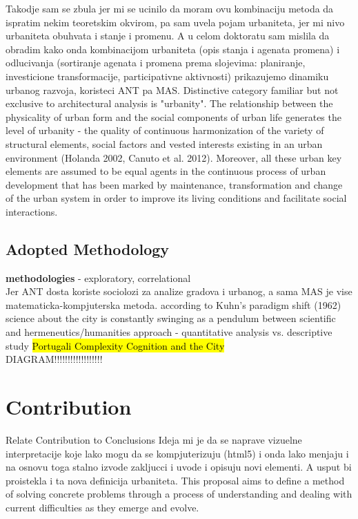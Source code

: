 \documentclass[11pt]{report}
\begin{document}
Takodje sam se zbula jer mi se ucinilo da moram ovu kombinaciju metoda da ispratim nekim teoretskim okvirom, pa sam uvela pojam urbaniteta, jer mi nivo urbaniteta obuhvata i stanje i promenu. A u celom doktoratu sam mislila da obradim kako onda kombinacijom urbaniteta (opis stanja i agenata promena) i odlucivanja (sortiranje agenata i promena prema slojevima: planiranje, investicione transformacije, participativne aktivnosti) prikazujemo dinamiku urbanog razvoja, koristeci  ANT pa MAS. 
Distinctive category familiar but not exclusive to architectural analysis is "urbanity". The relationship between the physicality of urban form and the social components of urban life generates the level of urbanity - the quality of continuous harmonization of the variety of structural elements, social factors and vested interests existing in an urban environment (Holanda 2002, Canuto et al. 2012). Moreover, all these urban key elements are assumed to be equal agents in the continuous process of urban development that has been marked by maintenance, transformation and change of the urban system in order to improve its living conditions and facilitate social interactions.

\subsection{Adopted Methodology}

\textbf{methodologies} - exploratory, correlational
\\
Jer ANT dosta koriste sociolozi za analize gradova i urbanog, a sama MAS je vise matematicka-kompjuterska metoda. 
according to Kuhn's paradigm shift (1962) science about the city is constantly swinging as a pendulum between scientific and hermeneutics/humanities approach - quantitative analysis vs. descriptive study \hl{Portugali Complexity Cognition and the City}
\\
DIAGRAM!!!!!!!!!!!!!!!!!!

\section{Contribution}

Relate Contribution to Conclusions
Ideja mi je da se naprave vizuelne interpretacije koje lako mogu da se kompjuterizuju (html5) i onda lako menjaju i na osnovu toga stalno izvode zakljucci i uvode i opisuju novi elementi.
A usput bi proistekla i ta nova definicija urbaniteta.
This proposal aims to define a method of solving concrete problems through a process of understanding and dealing with current difficulties as they emerge and evolve.
\end{document}
